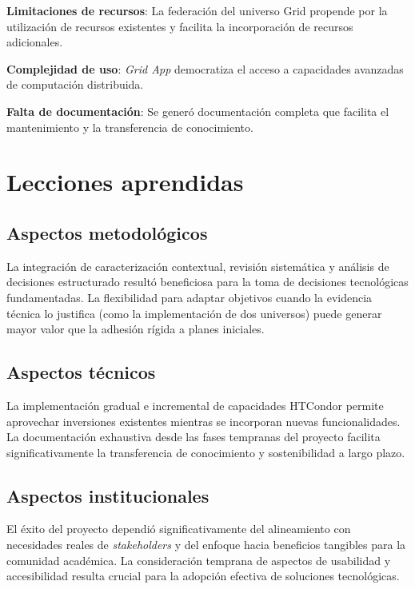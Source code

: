 \textbf{Limitaciones de recursos}: La federación del universo Grid propende por la utilización de recursos existentes y facilita la incorporación de recursos adicionales.

\textbf{Complejidad de uso}: \textit{Grid App} democratiza el acceso a capacidades avanzadas de computación distribuida.

\textbf{Falta de documentación}: Se generó documentación completa que facilita el mantenimiento y la transferencia de conocimiento.

\section{Lecciones aprendidas}
\noindent

\subsection{Aspectos metodológicos}
\noindent

La integración de caracterización contextual, revisión sistemática y análisis de decisiones estructurado resultó beneficiosa para la toma de decisiones tecnológicas fundamentadas. La flexibilidad para adaptar objetivos cuando la evidencia técnica lo justifica (como la implementación de dos universos) puede generar mayor valor que la adhesión rígida a planes iniciales.

\subsection{Aspectos técnicos}
\noindent

La implementación gradual e incremental de capacidades HTCondor permite aprovechar inversiones existentes mientras se incorporan nuevas funcionalidades. La documentación exhaustiva desde las fases tempranas del proyecto facilita significativamente la transferencia de conocimiento y sostenibilidad a largo plazo.

\subsection{Aspectos institucionales}
\noindent

El éxito del proyecto dependió significativamente del alineamiento con necesidades reales de \textit{stakeholders} y del enfoque hacia beneficios tangibles para la comunidad académica. La consideración temprana de aspectos de usabilidad y accesibilidad resulta crucial para la adopción efectiva de soluciones tecnológicas.

